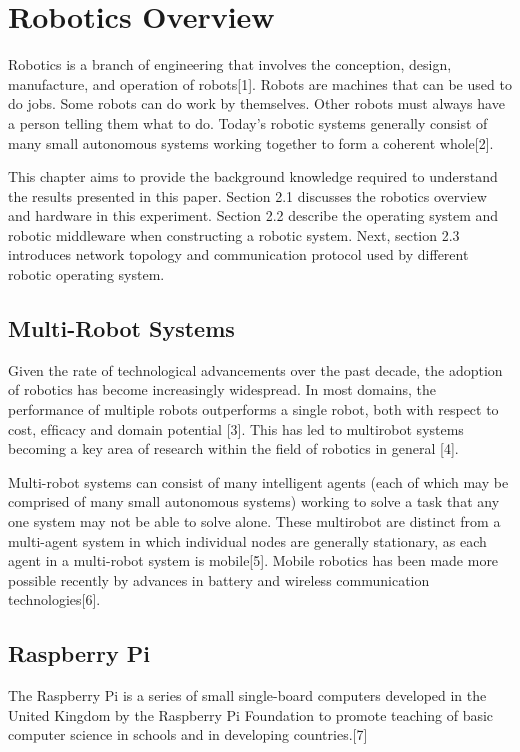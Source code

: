 \documentclass{mproj}
\begin{document}
\section{Robotics Overview}
Robotics is a branch of engineering that involves the conception, design, manufacture, and operation of robots[1]. Robots are machines that can be used to do jobs. Some robots can do work by themselves. Other robots must always have a person telling them what to do. Today’s robotic systems generally consist of many small autonomous systems working together to form a coherent whole[2].

This chapter aims to provide the background knowledge required to understand the results presented in this paper. Section 2.1 discusses the robotics overview and hardware in this experiment. Section 2.2 describe the operating system and robotic middleware when constructing a robotic system. Next, section 2.3 introduces network topology and communication protocol used by different robotic operating system. 

\subsection{Multi-Robot Systems}
Given the rate of technological advancements over the past decade, the adoption of robotics has become increasingly widespread. In most domains, the performance of multiple robots outperforms a single robot, both with respect to cost, efﬁcacy and domain potential [3]. This has led to multirobot systems becoming a key area of research within the ﬁeld of robotics in general [4].

Multi-robot systems can consist of many intelligent agents (each of which may be comprised of many small autonomous systems) working to solve a task that any one system may not be able to solve alone. These multirobot are distinct from a multi-agent system in which individual nodes are generally stationary, as each agent in a multi-robot system is mobile[5]. Mobile robotics has been made more possible recently by advances in battery and wireless communication technologies[6].

\subsection{Raspberry Pi}
The Raspberry Pi is a series of small single-board computers developed in the United Kingdom by the Raspberry Pi Foundation to promote teaching of basic computer science in schools and in developing countries.[7]
\end{document}
